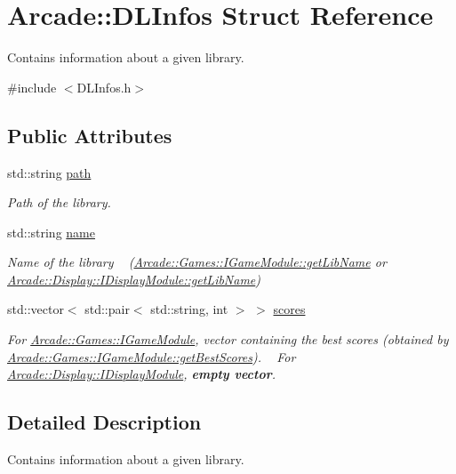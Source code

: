 \hypertarget{structArcade_1_1DLInfos}{}\section{Arcade\+::D\+L\+Infos Struct Reference}
\label{structArcade_1_1DLInfos}


Contains information about a given library.  




{\ttfamily \#include $<$D\+L\+Infos.\+h$>$}

\subsection*{Public Attributes}
\begin{DoxyCompactItemize}
\item 
\mbox{\label{structArcade_1_1DLInfos_abfb3fe67160a7d496c0a2a518140688e}} 
std\+::string \mbox{\hyperlink{structArcade_1_1DLInfos_abfb3fe67160a7d496c0a2a518140688e}{path}}
\begin{DoxyCompactList}\small\item\em Path of the library. \end{DoxyCompactList}\item 
\mbox{\label{structArcade_1_1DLInfos_ac6cc8fa88def549ce156d5e26a16601b}} 
std\+::string \mbox{\hyperlink{structArcade_1_1DLInfos_ac6cc8fa88def549ce156d5e26a16601b}{name}}
\begin{DoxyCompactList}\small\item\em Name of the library ~\newline
{\itshape (\mbox{\hyperlink{classArcade_1_1Games_1_1IGameModule_a30966cbaa00abbd2a211cf152ea595f2}{Arcade\+::\+Games\+::\+I\+Game\+Module\+::get\+Lib\+Name}} or \mbox{\hyperlink{classArcade_1_1Display_1_1IDisplayModule_a0d8e957815e94766bdefbd7a5043e81a}{Arcade\+::\+Display\+::\+I\+Display\+Module\+::get\+Lib\+Name}})} \end{DoxyCompactList}\item 
\mbox{\label{structArcade_1_1DLInfos_a32cca0ffa7c6fc647552dc969f1f5394}} 
std\+::vector$<$ std\+::pair$<$ std\+::string, int $>$ $>$ \mbox{\hyperlink{structArcade_1_1DLInfos_a32cca0ffa7c6fc647552dc969f1f5394}{scores}}
\begin{DoxyCompactList}\small\item\em For \mbox{\hyperlink{classArcade_1_1Games_1_1IGameModule}{Arcade\+::\+Games\+::\+I\+Game\+Module}}, vector containing the best scores {\itshape (obtained by \mbox{\hyperlink{classArcade_1_1Games_1_1IGameModule_afaec4931b0051ba589fbe1b14d20131b}{Arcade\+::\+Games\+::\+I\+Game\+Module\+::get\+Best\+Scores}})}. ~\newline
For \mbox{\hyperlink{classArcade_1_1Display_1_1IDisplayModule}{Arcade\+::\+Display\+::\+I\+Display\+Module}}, {\bfseries{empty vector}}. \end{DoxyCompactList}\end{DoxyCompactItemize}


\subsection{Detailed Description}
Contains information about a given library. 